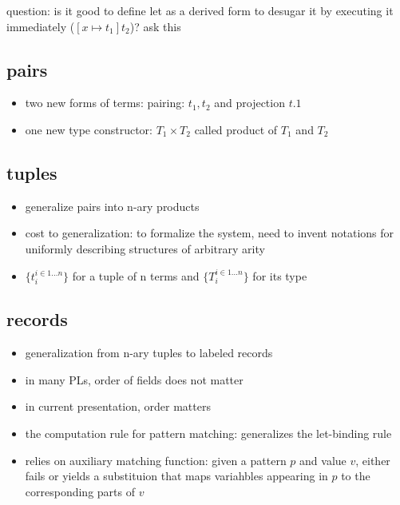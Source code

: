 \documentclass[11pt]{article}
\begin{document}
question: is it good to define let as a derived form to desugar it by executing it immediately (\([x \mapsto t_1]t_2\))? ask this

\subsection{pairs}
\label{sec:orge3b78cf}
\begin{itemize}
\item two new forms of terms: pairing: \({t_1,t_2}\) and projection \(t.1\)
\item one new type constructor: \(T_1 \times T_2\) called product of \(T_1\) and \(T_2\)
\end{itemize}

\subsection{tuples}
\label{sec:orgdd67dba}
\begin{itemize}
\item generalize pairs into n-ary products
\item cost to generalization: to formalize the system, need to invent notations for uniformly describing structures of arbitrary arity
\item \(\{t_i^{i \in 1...n}\}\) for a tuple of n terms and \(\{T_i^{i \in 1...n}\}\) for its type
\end{itemize}

\subsection{records}
\label{sec:org7042897}
\begin{itemize}
\item generalization from n-ary tuples to labeled records
\item in many PLs, order of fields does not matter
\item in current presentation, order matters
\item the computation rule for pattern matching: generalizes the let-binding rule
\item relies on auxiliary matching function: given a pattern \(p\) and value \(v\), either fails or yields a substituion that maps variahbles appearing in \(p\) to the corresponding parts of \(v\)
\end{itemize}
\end{document}
